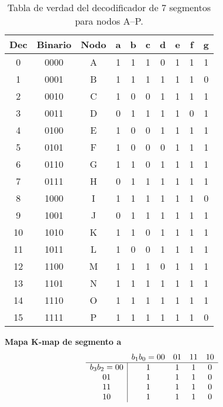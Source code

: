 \documentclass[12pt]{article}
\begin{document}

\begin{table}[h!]
\centering
\begin{tabular}{|c|c|c||c|c|c|c|c|c|c|}
\hline
\textbf{Dec} & \textbf{Binario} & \textbf{Nodo} 
  & \textbf{a} & \textbf{b} & \textbf{c} & \textbf{d} & \textbf{e} & \textbf{f} & \textbf{g} \\
\hline
0  & 0000 & A & 1 & 1 & 1 & 0 & 1 & 1 & 1 \\  
1  & 0001 & B & 1 & 1 & 1 & 1 & 1 & 1 & 0 \\  
2  & 0010 & C & 1 & 0 & 0 & 1 & 1 & 1 & 1 \\  
3  & 0011 & D & 0 & 1 & 1 & 1 & 1 & 0 & 1 \\  
4  & 0100 & E & 1 & 0 & 0 & 1 & 1 & 1 & 1 \\  
5  & 0101 & F & 1 & 0 & 0 & 0 & 1 & 1 & 1 \\  
6  & 0110 & G & 1 & 1 & 0 & 1 & 1 & 1 & 1 \\  
7  & 0111 & H & 0 & 1 & 1 & 1 & 1 & 1 & 1 \\  
8  & 1000 & I & 1 & 1 & 1 & 1 & 1 & 1 & 0 \\  
9  & 1001 & J & 0 & 1 & 1 & 1 & 1 & 1 & 1 \\  
10 & 1010 & K & 1 & 1 & 0 & 1 & 1 & 1 & 1 \\  
11 & 1011 & L & 1 & 0 & 0 & 1 & 1 & 1 & 1 \\  
12 & 1100 & M & 1 & 1 & 1 & 0 & 1 & 1 & 1 \\  
13 & 1101 & N & 1 & 1 & 1 & 1 & 1 & 1 & 1 \\  
14 & 1110 & O & 1 & 1 & 1 & 1 & 1 & 1 & 1 \\  
15 & 1111 & P & 1 & 1 & 1 & 1 & 1 & 1 & 0 \\  
\hline
\end{tabular}
\caption{Tabla de verdad del decodificador de 7 segmentos para nodos A–P.}
\label{tab:7seg_decoder}
\end{table}

\bigskip
\noindent

\medskip
\noindent
\textbf{Mapa K‐map de segmento \textsf{a}}  
\[
\begin{array}{c|cccc}
\multicolumn{1}{c}{} & \multicolumn{1}{c}{b_1b_0=00} & \multicolumn{1}{c}{01} & \multicolumn{1}{c}{11} & \multicolumn{1}{c}{10} \\
\hline
b_3b_2=00 & 1 & 1 & 1 & 0 \\
01       & 1 & 1 & 1 & 0 \\
11       & 1 & 1 & 1 & 0 \\
10       & 1 & 1 & 1 & 0 \\
\end{array}
\]
\vspace{1em}
\end{document}
